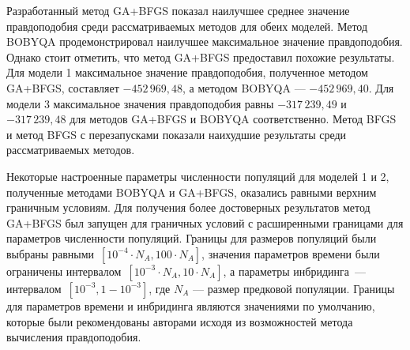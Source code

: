 \begin{table}[ht]
    \centering
    \caption{Результаты 100 повторов различных методов для поиска параметров модели 2 с инбридингом демографической истории двух популяций пум}
    \label{tab:part2:experiments:puma:puma_F_res}
\end{table}

Разработанный метод GA+BFGS показал наилучшее среднее значение правдоподобия среди рассматриваемых методов для обеих моделей.
Метод BOBYQA продемонстрировал наилучшее максимальное значение правдоподобия.
Однако стоит отметить, что метод GA+BFGS предоставил похожие результаты.
Для модели 1 максимальное значение правдоподобия, полученное методом GA+BFGS, составляет $-452{\,}969{,}48$, а методом BOBYQA --- $-452{\,}969{,}40$.
Для модели 3 максимальное значения правдоподобия равны $-317{\,}239{,}49$ и $-317{\,}239{,}48$ для методов GA+BFGS и BOBYQA соответственно.
Метод BFGS и метод BFGS с перезапусками показали наихудшие результаты среди рассматриваемых методов.

Некоторые настроенные параметры численности популяций для моделей 1 и 2, полученные методами BOBYQA и GA+BFGS, оказались равными верхним граничным условиям.
Для получения более достоверных результатов метод GA+BFGS был запущен для граничных условий с расширенными границами для параметров численности популяций.
Границы для размеров популяций были выбраны равными~${[10^{-4}\cdot N_A, 100 \cdot N_A]}$, значения параметров времени были ограничены интервалом~${[10^{-3}\cdot N_A, 10 \cdot N_A]}$, а параметры инбридинга~--- интервалом~${[10^{-3}, 1-10^{-3}]}$, где $N_A$ --- размер предковой популяции.
Границы для параметров времени и инбридинга являются значениями по умолчанию, которые были рекомендованы авторами \dadi исходя из возможностей метода вычисления правдоподобия.

